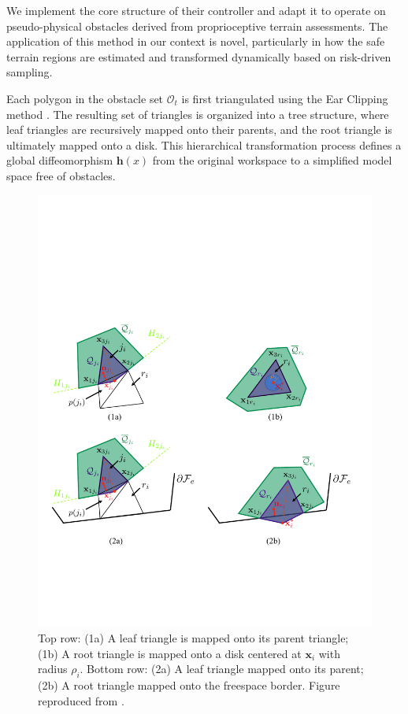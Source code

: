 We implement the core structure of their controller and adapt it to operate on pseudo-physical obstacles derived from proprioceptive terrain assessments. The application of this method in our context is novel, particularly in how the safe terrain regions are estimated and transformed dynamically based on risk-driven sampling.

Each polygon in the obstacle set \( \mathcal{O}_t \) is first triangulated using the Ear Clipping method \cite{ELGINDY1993719}. The resulting set of triangles is organized into a tree structure, where leaf triangles are recursively mapped onto their parents, and the root triangle is ultimately mapped onto a disk. This hierarchical transformation process defines a global diffeomorphism \( \mathbf{h}(x) \) from the original workspace to a simplified model space free of obstacles.

\begin{figure}[H]
    \centering
    \includegraphics[width=0.8\linewidth]{figures/purging.pdf}
    \caption{Top row: (1a) A leaf triangle is mapped onto its parent triangle; (1b) A root triangle is mapped onto a disk centered at \( \mathbf{x}_i \) with radius \( \rho_i \). 
    Bottom row: (2a) A leaf triangle mapped onto its parent; (2b) A root triangle mapped onto the freespace border. 
    Figure reproduced from \textcite{vasilopoulos2021reactivenavigationpartiallyfamiliar}.}
    \label{fig:purging}
\end{figure}

